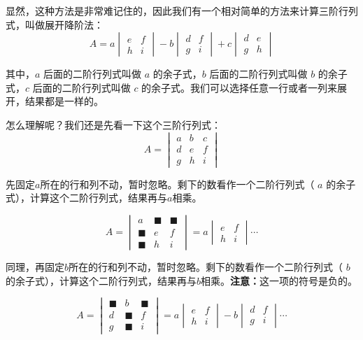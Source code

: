 显然，这种方法是非常难记住的，因此我们有一个相对简单的方法来计算三阶行列式，叫做展开降阶法：
$$A = a \begin{vmatrix}
    e & f \\
    h & i
  \end{vmatrix} - b \begin{vmatrix}
    d & f \\
    g & i
  \end{vmatrix} + c \begin{vmatrix}
    d & e \\
    g & h
  \end{vmatrix}$$

其中，$a$ 后面的二阶行列式叫做 $a$ 的余子式，$b$ 后面的二阶行列式叫做 $b$ 的余子式，$c$ 后面的二阶行列式叫做 $c$ 的余子式。我们可以选择任意一行或者一列来展开，结果都是一样的。

怎么理解呢？我们还是先看一下这个三阶行列式：
\[
A = \begin{vmatrix}
    a & b & c \\
    d & e & f \\
    g & h & i
  \end{vmatrix}
\]

先固定$a$所在的行和列不动，暂时忽略。剩下的数看作一个二阶行列式（ $a$ 的余子式），计算这个二阶行列式，结果再与$a$相乘。

\[
A = \begin{vmatrix}
    a & \blacksquare & \blacksquare \\
    \blacksquare & e & f \\
    \blacksquare & h & i
  \end{vmatrix}
  = a \begin{vmatrix}
    e & f \\
    h & i
  \end{vmatrix}
  \cdots
\]

同理，再固定$b$所在的行和列不动，暂时忽略。剩下的数看作一个二阶行列式（ $b$ 的余子式），计算这个二阶行列式，结果再与$b$相乘。\textbf{注意：}这一项的符号是负的。

\[
A = \begin{vmatrix}
    \blacksquare & b & \blacksquare \\
    d & \blacksquare & f \\
    g & \blacksquare & i
  \end{vmatrix}
  = a \begin{vmatrix}
    e & f \\
    h & i
  \end{vmatrix}
  - b \begin{vmatrix}
    d & f \\
    g & i
    \end{vmatrix}
    \cdots
\]

